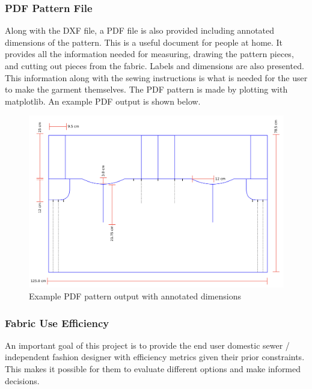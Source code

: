 \subsubsection{PDF Pattern File}
Along with the DXF file, a PDF file is also provided including annotated dimensions of the pattern. This is a useful document for people at home. It provides all the information needed for measuring, drawing the pattern pieces, and cutting out pieces from the fabric. Labels and dimensions are also presented. This information along with the sewing instructions is what is needed for the user to make the garment themselves. The PDF pattern is made by plotting with matplotlib. An example PDF output is shown below.
\begin{figure} [H] %
    \centering %
    \includegraphics[width = \textwidth]{Images/example pdf output.png} %
    \caption{Example PDF pattern output with annotated dimensions}
\end{figure}


\subsubsection{Fabric Use Efficiency}
An important goal of this project is to provide the end user domestic sewer / independent fashion designer with efficiency metrics given their prior constraints. This makes it possible for them to evaluate different options and make informed decisions.

